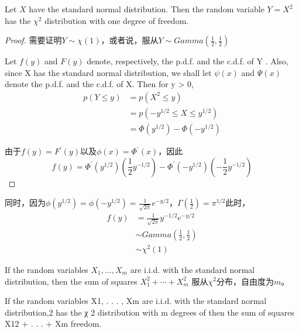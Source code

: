 \documentclass[../../main.tex]{subfiles}
\begin{document}
\begin{theorem}{}{}
Let $X$ have the standard normal distribution. Then the random variable $Y=X^2$ has the $\chi^2$ distribution with one degree of freedom.
\end{theorem}
\begin{proof}
需要证明$Y\sim \chi(1)$，或者说，服从$Y\sim Gamma(\frac{1}{2}, \frac{1}{2})$

Let $f(y)$ and $F(y)$ denote, respectively, the p.d.f. and the c.d.f. of Y . Also, since X has the standard normal distribution, we shall let $\psi(x)$ and $\Psi(x)$ denote the p.d.f. and the c.d.f. of X. Then for y > 0,
\begin{equation}\label{}
\begin{split}
p(Y\leqslant y)&=p(X^2\leqslant y)\\
&=p(-y^{1/2} \leqslant X \leqslant y^{1/2})\\
&=\Phi(y^{1/2}) - \Phi(-y^{1/2})
\end{split}
\end{equation}

由于$f(y)=F^{'}(y)$以及$\phi(x)=\Phi^{'}(x)$，因此
\begin{equation}\label{}
f(y)=\Phi^{'}(y^{1/2})(\frac{1}{2}y^{-1/2}) - \Phi^{'}(-y^{1/2})(-\frac{1}{2}y^{-1/2})
\end{equation}
\end{proof}
同时，因为$\phi(y^{1/2})=\phi(-y^{1/2})=\frac{1}{\sqrt{2\pi}}e^{-y/2}$，$\Gamma(\frac{1}{2})=\pi^{1/2}$此时，
\begin{equation}\label{}
\begin{split}
f(y)&=\frac{1}{\sqrt{2\pi}}y^{-1/2}e^{-y/2}\\
&\sim Gamma(\frac{1}{2}, \frac{1}{2})\\
&\sim \chi^2(1)
\end{split}
\end{equation}

\begin{corollary}
If the random variables $X_1, \dots, X_m$ are i.i.d. with the standard normal distribution, then the sum of squares $X_1^2+\cdots+X_m^2$ 服从$\chi^2$分布，自由度为$m$。
\end{corollary}
If the random variables X1, . . . , Xm are i.i.d. with the standard normal distribution,2 has the χ 2 distribution with m degrees of
then the sum of squares X12 + . . . + Xm
freedom.
\end{document}
